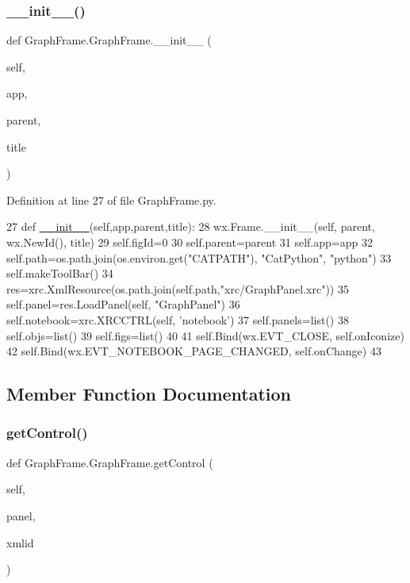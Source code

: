 \subsubsection{\texorpdfstring{\+\_\+\+\_\+init\+\_\+\+\_\+()}{\_\_init\_\_()}}
{\footnotesize\ttfamily def Graph\+Frame.\+Graph\+Frame.\+\_\+\+\_\+init\+\_\+\+\_\+ (\begin{DoxyParamCaption}\item[{}]{self,  }\item[{}]{app,  }\item[{}]{parent,  }\item[{}]{title }\end{DoxyParamCaption})}



Definition at line 27 of file Graph\+Frame.\+py.


\begin{DoxyCode}
27     \textcolor{keyword}{def }\hyperlink{classwrapper_1_1ModuleDictWrapper_a9a7a794150502f51df687831583e13b9}{\_\_init\_\_}(self,app,parent,title): 
28         wx.Frame.\_\_init\_\_(self, parent, wx.NewId(), title)
29         self.figId=0
30         self.parent=parent
31         self.app=app
32         self.path=os.path.join(os.environ.get(\textcolor{stringliteral}{"CATPATH"}), \textcolor{stringliteral}{"CatPython"}, \textcolor{stringliteral}{"python"})
33         self.makeToolBar()
34         res=xrc.XmlResource(os.path.join(self.path,\textcolor{stringliteral}{"xrc/GraphPanel.xrc"}))
35         self.panel=res.LoadPanel(self, \textcolor{stringliteral}{"GraphPanel"})
36         self.notebook=xrc.XRCCTRL(self, \textcolor{stringliteral}{'notebook'})
37         self.panels=list()
38         self.objs=list()
39         self.figs=list()
40 
41         self.Bind(wx.EVT\_CLOSE, self.onIconize)
42         self.Bind(wx.EVT\_NOTEBOOK\_PAGE\_CHANGED, self.onChange)
43 
\end{DoxyCode}


\subsection{Member Function Documentation}
\mbox{\label{classGraphFrame_1_1GraphFrame_aa7c1ad6c83d55119ad9d14f7fe6b3179}} 
\subsubsection{\texorpdfstring{get\+Control()}{getControl()}}
{\footnotesize\ttfamily def Graph\+Frame.\+Graph\+Frame.\+get\+Control (\begin{DoxyParamCaption}\item[{}]{self,  }\item[{}]{panel,  }\item[{}]{xmlid }\end{DoxyParamCaption})}

